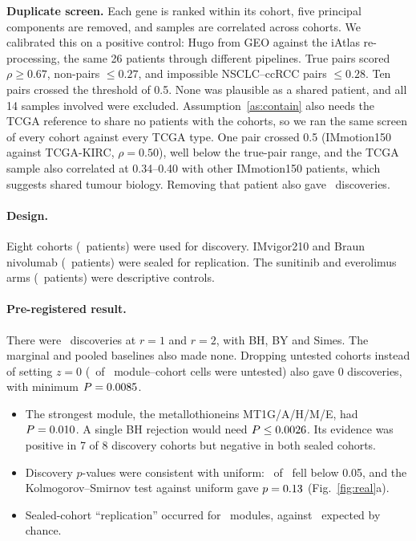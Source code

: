 \documentclass[10pt,twocolumn,letterpaper]{article}
\theoremstyle{remark}
\begin{document}
\textbf{Duplicate screen.} Each gene is ranked within its cohort, five principal components are removed, and samples are correlated across cohorts. We calibrated this on a positive control: Hugo from GEO against the iAtlas re-processing, the same 26 patients through different pipelines. True pairs scored $\rho\ge0.67$, non-pairs $\le0.27$, and impossible NSCLC--ccRCC pairs $\le0.28$. Ten pairs crossed the threshold of 0.5. None was plausible as a shared patient, and all 14 samples involved were excluded. Assumption~\ref{as:contain} also needs the TCGA reference to share no patients with the cohorts, so we ran the same screen of every cohort against every TCGA type. One pair crossed 0.5 (IMmotion150 against TCGA-KIRC, $\rho=0.50$), well below the true-pair range, and the TCGA sample also correlated at 0.34--0.40 with other IMmotion150 patients, which suggests shared tumour biology. Removing that patient also gave \nDiscovered\ discoveries.

\paragraph{Design.} Eight cohorts (\nDisc\ patients) were used for discovery. IMvigor210 and Braun nivolumab (\nSeal\ patients) were sealed for replication. The sunitinib and everolimus arms (\nCtrl\ patients) were descriptive controls.

\begin{table}[t]
\centering\footnotesize
\caption{Cohorts after duplicate exclusion.}
\label{tab:cohorts}
\resizebox{\columnwidth}{!}{}
\end{table}

\paragraph{Pre-registered result.} There were \nDiscovered\ discoveries at $r=1$ and $r=2$, with BH, BY and Simes. The marginal and pooled baselines also made none. Dropping untested cohorts instead of setting $z=0$ (\nUntested\ of \nCells\ module--cohort cells were untested) also gave 0 discoveries, with minimum $P=0.0085$.
\begin{itemize}
  \item The strongest module, the metallothioneins MT1G/A/H/M/E, had $P=0.010$. A single BH rejection would need $P\le0.0026$. Its evidence was positive in 7 of 8 discovery cohorts but negative in both sealed cohorts.
  \item Discovery $p$-values were consistent with uniform: \nBelow\ of \nModules\ fell below 0.05, and the Kolmogorov--Smirnov test against uniform gave $p=0.13$ (Fig.~\ref{fig:real}a).
  \item Sealed-cohort ``replication'' occurred for \nReplicated\ modules, against \expReplicated\ expected by chance.
\end{itemize}
\end{document}
